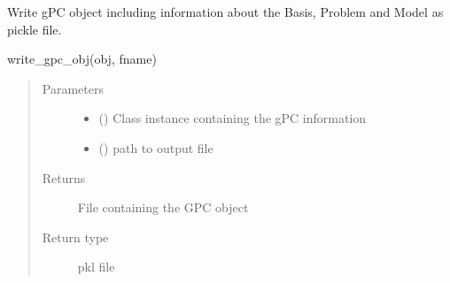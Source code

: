 \documentclass[letterpaper,10pt,english,openany,oneside]{sphinxmanual}
\begin{document}
\begin{fulllineitems}
\label{\detokenize{pygpc:pygpc.io.write_gpc_pkl}}
Write gPC object including information about the Basis, Problem and Model as pickle file.

write\_gpc\_obj(obj, fname)
\begin{quote}\begin{description}
\item[{Parameters}] \leavevmode\begin{itemize}
\item {} 
 ({\hyperref[\detokenize{pygpc:pygpc.GPC.GPC}]{}}) \textendash{} Class instance containing the gPC information

\item {} 
 () \textendash{} path to output file

\end{itemize}

\item[{Returns}] \leavevmode
{} \textendash{} File containing the GPC object

\item[{Return type}] \leavevmode
pkl file

\end{description}\end{quote}

\end{fulllineitems}

\end{document}
